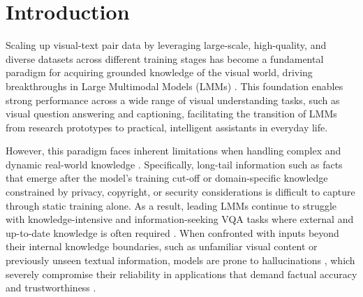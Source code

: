 \documentclass{article}
\begin{document}
\newpage
\section{Introduction}
\label{main/intro}
Scaling up visual-text pair data by leveraging large-scale, high-quality, and diverse datasets across different training stages \cite{dataset/clip,dataset/mint-1t,dataset/2p5-years-in-class,dataset/100b-pretrain,dataset/sail-douyin} has become a fundamental paradigm for acquiring grounded knowledge of the visual world, driving breakthroughs in Large Multimodal Models (LMMs) \cite{lmm/gpt4o,lmm/gemini,lmm/kimi-vl,lmm/qw25vl,lmm/llava-ov,lmm/aira,lmm/vila,lmm/internvl}. This foundation enables strong performance across a wide range of visual understanding tasks, such as visual question answering and captioning, facilitating the transition of LMMs from research prototypes to practical, intelligent assistants in everyday life.
 
 However, this paradigm faces inherent limitations when handling complex and dynamic real-world knowledge \cite{intro/pretrain-limit-1,intro/pretrain-limit-2}. Specifically, long-tail information such as facts that emerge after the model’s training cut-off or domain-specific knowledge constrained by privacy, copyright, or security considerations is difficult to capture through static training alone. As a result, leading LMMs continue to struggle with knowledge-intensive and information-seeking VQA tasks where external and up-to-date knowledge is often required \cite{intro/struggle-1,vision-rag/mmsearch,dataset/livevqa}. When confronted with inputs beyond their internal knowledge boundaries, such as unfamiliar visual content or previously unseen textual information, models are prone to hallucinations \cite{intro/hallucination-risk-2,intro/hallucination-risk-3}, which severely compromise their reliability in applications that demand factual accuracy and trustworthiness \cite{intro/hallucination-risk-1}.
\end{document}
